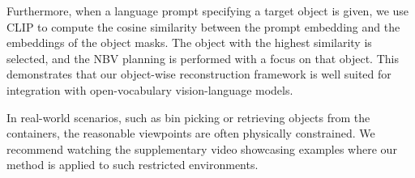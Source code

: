 Furthermore, when a language prompt specifying a target object is given, we use CLIP to compute the cosine similarity between the prompt embedding and the embeddings of the object masks. The object with the highest similarity is selected, and the NBV planning is performed with a focus on that object. This demonstrates that our object-wise reconstruction framework is well suited for integration with open-vocabulary vision-language models.



In real-world scenarios, such as bin picking or retrieving objects from the containers, the reasonable viewpoints are often physically constrained. We recommend watching the supplementary video showcasing examples where our method is applied to such restricted environments.

